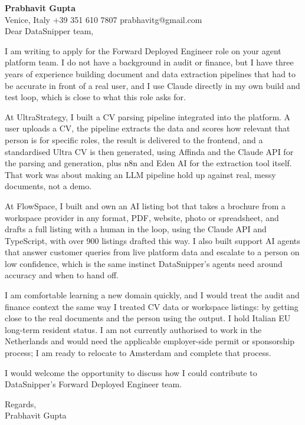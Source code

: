 \documentclass[a4paper,10.5pt]{article}
\begin{document}
\textbf{Prabhavit Gupta}\\
Venice, Italy \textbar{} +39 351 610 7807 \textbar{} prabhavitg@gmail.com\\[10pt]
Dear DataSnipper team,

I am writing to apply for the Forward Deployed Engineer role on your agent platform team. I do not have a background in audit or finance, but I have three years of experience building document and data extraction pipelines that had to be accurate in front of a real user, and I use Claude directly in my own build and test loop, which is close to what this role asks for.

At UltraStrategy, I built a CV parsing pipeline integrated into the platform. A user uploads a CV, the pipeline extracts the data and scores how relevant that person is for specific roles, the result is delivered to the frontend, and a standardised Ultra CV is then generated, using Affinda and the Claude API for the parsing and generation, plus n8n and Eden AI for the extraction tool itself. That work was about making an LLM pipeline hold up against real, messy documents, not a demo.

At FlowSpace, I built and own an AI listing bot that takes a brochure from a workspace provider in any format, PDF, website, photo or spreadsheet, and drafts a full listing with a human in the loop, using the Claude API and TypeScript, with over 900 listings drafted this way. I also built support AI agents that answer customer queries from live platform data and escalate to a person on low confidence, which is the same instinct DataSnipper's agents need around accuracy and when to hand off.

I am comfortable learning a new domain quickly, and I would treat the audit and finance context the same way I treated CV data or workspace listings: by getting close to the real documents and the person using the output. I hold Italian EU long-term resident status. I am not currently authorised to work in the Netherlands and would need the applicable employer-side permit or sponsorship process; I am ready to relocate to Amsterdam and complete that process.

I would welcome the opportunity to discuss how I could contribute to DataSnipper's Forward Deployed Engineer team.

Regards,\\
Prabhavit Gupta
\end{document}
